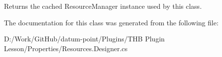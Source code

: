 Returns the cached Resource\+Manager instance used by this class. 



The documentation for this class was generated from the following file\+:\begin{DoxyCompactItemize}
\item 
D\+:/\+Work/\+Git\+Hub/datum-\/point/\+Plugins/\+T\+H\+B Plugin Lesson/\+Properties/Resources.\+Designer.\+cs\end{DoxyCompactItemize}
